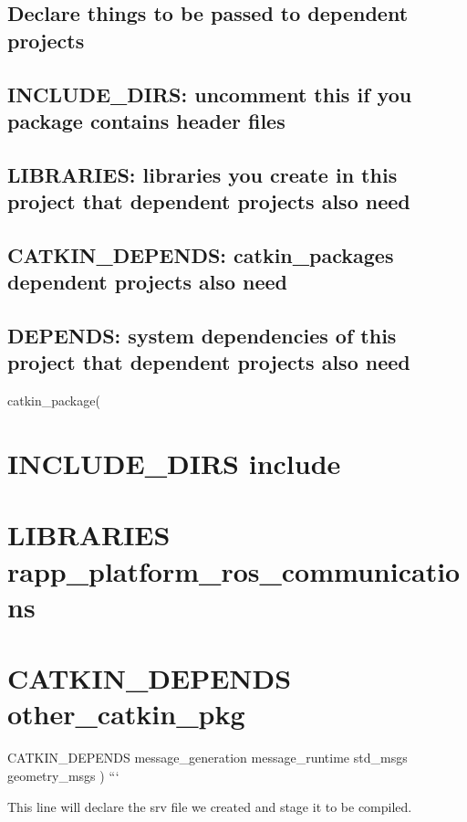 \subsection*{Declare things to be passed to dependent projects}

\subsection*{I\-N\-C\-L\-U\-D\-E\-\_\-\-D\-I\-R\-S\-: uncomment this if you package contains header files}

\subsection*{L\-I\-B\-R\-A\-R\-I\-E\-S\-: libraries you create in this project that dependent projects also need}

\subsection*{C\-A\-T\-K\-I\-N\-\_\-\-D\-E\-P\-E\-N\-D\-S\-: catkin\-\_\-packages dependent projects also need}

\subsection*{D\-E\-P\-E\-N\-D\-S\-: system dependencies of this project that dependent projects also need}

catkin\-\_\-package( \section*{I\-N\-C\-L\-U\-D\-E\-\_\-\-D\-I\-R\-S include}

\section*{L\-I\-B\-R\-A\-R\-I\-E\-S rapp\-\_\-platform\-\_\-ros\-\_\-communications}

\section*{C\-A\-T\-K\-I\-N\-\_\-\-D\-E\-P\-E\-N\-D\-S other\-\_\-catkin\-\_\-pkg}

C\-A\-T\-K\-I\-N\-\_\-\-D\-E\-P\-E\-N\-D\-S message\-\_\-generation message\-\_\-runtime std\-\_\-msgs geometry\-\_\-msgs ) ```

This line will declare the srv file we created and stage it to be compiled.

